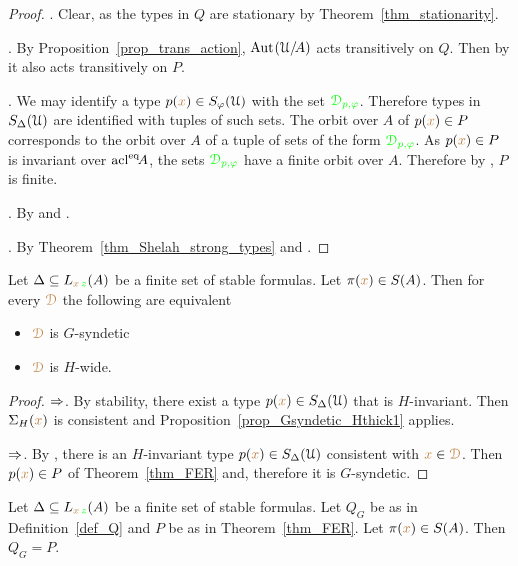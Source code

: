 \begin{proof}
  .
  Clear, as the types in $Q$ are stationary by Theorem~\ref{thm_stationarity}.
  
  .
  By Proposition~\ref{prop_trans_action}, ${\rm Aut\kern.15ex}(\EuScript U/\!A)$ acts transitively on $Q$.
  Then by  it also acts transitively on $P$.

  .
  We may identify a type $p({\color{brown} x})\in S_\varphi(\EuScript U)$ with the set ${\color{green}\EuScript D_{p,\varphi}}$.
  Therefore types in $S_\Delta(\EuScript U)$ are identified with tuples of such sets.
  The orbit over $A$ of $p({\color{brown} x})\in P$ corresponds to the orbit over $A$ of a tuple of sets of the form ${\color{green}\EuScript D_{p,\varphi}}$.
  As $p({\color{brown} x})\in P$ is invariant over ${\rm acl}^{{\rm eq}}\!A$, the sets ${\color{green}\EuScript D_{p,\varphi}}$ have a finite orbit over $A$.
  Therefore by , $P$ is finite.

  .
  By  and .

  .
  By Theorem~\ref{thm_Shelah_strong_types} and .
\end{proof}

\begin{proposition}\label{prop_Gsyndetic_thick}
  Let $\Delta\subseteq L_{{\color{brown} x}\,{\color{green} z}}(A)$ be a finite set of stable formulas.
  Let $\pi({\color{brown} x})\in S(A)$.
  Then for every ${\color{brown}\EuScript D}$ the following are equivalent
  \begin{itemize}
    \item [1.] ${\color{brown}\EuScript D}$ is $G$-syndetic
    \item [2.] ${\color{brown}\EuScript D}$ is $H$-wide.
  \end{itemize}\smallskip
\end{proposition}

\begin{proof}
  $\Rightarrow$.
  By stability, there exist a type $p({\color{brown} x})\in S_\Delta(\EuScript U)$ that is $H$-invariant.
  Then $\Sigma_H({\color{brown} x})$ is consistent and Proposition~\ref{prop_Gsyndetic_Hthick1} applies.
  
  $\Rightarrow$.
  By , there is an $H$-invariant type $p({\color{brown} x})\in S_\Delta(\EuScript U)$ consistent with ${\color{brown} x}\in{\color{brown}\EuScript D}$.
  Then $p({\color{brown} x})\in P$ of Theorem~\ref{thm_FER} and, therefore it is  $G$-syndetic.
\end{proof}

\begin{theorem}\label{thm_P=Q}
  Let $\Delta\subseteq L_{{\color{brown} x}\,{\color{green} z}}(A)$ be a finite set of stable formulas.
  Let $Q_G$ be as in Definition~\ref{def_Q} and $P$ be as in Theorem~\ref{thm_FER}.
  Let $\pi({\color{brown} x})\in S(A)$.
  Then $Q_G=P$.
\end{theorem}

